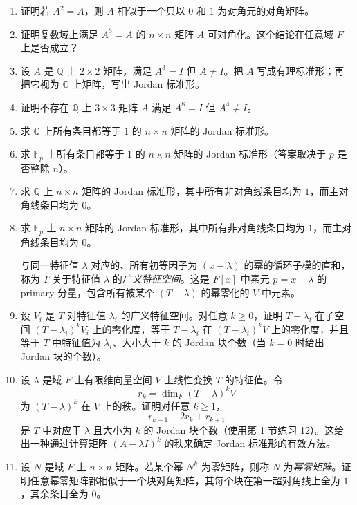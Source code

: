 \begin{enumerate}[label=\arabic*.]
\item 证明若 $A^2=A$，则 $A$ 相似于一个只以 $0$ 和 $1$ 为对角元的对角矩阵。

\item 证明复数域上满足 $A^3=A$ 的 $n\times n$ 矩阵 $A$ 可对角化。这个结论在任意域 $F$ 上是否成立？

\item 设 $A$ 是 $\mathbb Q$ 上 $2\times2$ 矩阵，满足 $A^3=I$ 但 $A\ne I$。把 $A$ 写成有理标准形；再把它视为 $\mathbb C$ 上矩阵，写出 Jordan 标准形。

\item 证明不存在 $\mathbb Q$ 上 $3\times3$ 矩阵 $A$ 满足 $A^8=I$ 但 $A^4\ne I$。

\item 求 $\mathbb Q$ 上所有条目都等于 $1$ 的 $n\times n$ 矩阵的 Jordan 标准形。

\item 求 $\mathbb F_p$ 上所有条目都等于 $1$ 的 $n\times n$ 矩阵的 Jordan 标准形（答案取决于 $p$ 是否整除 $n$）。

\item 求 $\mathbb Q$ 上 $n\times n$ 矩阵的 Jordan 标准形，其中所有非对角线条目均为 $1$，而主对角线条目均为 $0$。

\item 求 $\mathbb F_p$ 上 $n\times n$ 矩阵的 Jordan 标准形，其中所有非对角线条目均为 $1$，而主对角线条目均为 $0$。

与同一特征值 $\lambda$ 对应的、所有初等因子为 $(x-\lambda)$ 的幂的循环子模的直和，称为 $T$ 关于特征值 $\lambda$ 的\emph{广义特征空间}。这是 $F[x]$ 中素元 $p=x-\lambda$ 的 primary 分量，包含所有被某个 $(T-\lambda)$ 的幂零化的 $V$ 中元素。

\item 设 $V_i$ 是 $T$ 对特征值 $\lambda_i$ 的广义特征空间。对任意 $k\geq0$，证明 $T-\lambda_i$ 在子空间 $(T-\lambda_i)^kV_i$ 上的零化度，等于 $T-\lambda_i$ 在 $(T-\lambda_i)^kV$ 上的零化度，并且等于 $T$ 中特征值为 $\lambda_i$、大小大于 $k$ 的 Jordan 块个数（当 $k=0$ 时给出 Jordan 块的个数）。

\item 设 $\lambda$ 是域 $F$ 上有限维向量空间 $V$ 上线性变换 $T$ 的特征值。令
\[
r_k=\dim_F (T-\lambda)^kV
\]
为 $(T-\lambda)^k$ 在 $V$ 上的秩。证明对任意 $k\geq1$，
\[
r_{k-1}-2r_k+r_{k+1}
\]
是 $T$ 中对应于 $\lambda$ 且大小为 $k$ 的 Jordan 块个数（使用第 1 节练习 12）。这给出一种通过计算矩阵 $(A-\lambda I)^k$ 的秩来确定 Jordan 标准形的有效方法。

\item 设 $N$ 是域 $F$ 上 $n\times n$ 矩阵。若某个幂 $N^k$ 为零矩阵，则称 $N$ 为\emph{幂零矩阵}。证明任意幂零矩阵都相似于一个块对角矩阵，其每个块在第一超对角线上全为 $1$，其余条目全为 $0$。


\end{enumerate}
